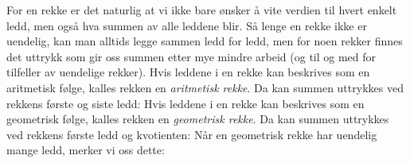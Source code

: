 For en rekke er det naturlig at vi ikke bare ønsker å vite verdien til hvert enkelt ledd, men også hva summen av alle leddene blir. Så lenge en rekke ikke er uendelig, kan man alltids legge sammen ledd for ledd, men for noen rekker finnes det uttrykk som gir oss summen etter mye mindre arbeid (og til og med for tilfeller av uendelige rekker).
\newpage
{} 
Hvis leddene i en rekke kan beskrives som en aritmetisk følge, kalles rekken en \textit{aritmetisk rekke}. Da kan summen uttrykkes ved rekkens første og siste ledd: \regv
\sar
\sare
{} 
Hvis leddene i en rekke kan beskrives som en geometrisk følge, kalles rekken en \textit{geometrisk rekke}. Da kan summen uttrykkes ved rekkens første ledd og kvotienten:\regv
\sge
{}
Når en geometrisk rekke har uendelig mange ledd, merker vi oss dette:

